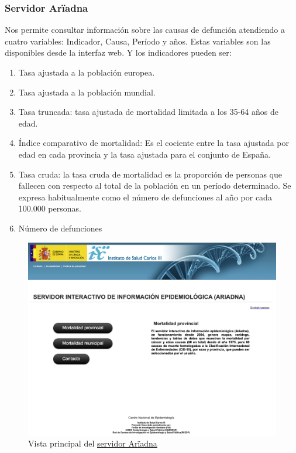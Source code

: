 \subsubsection{Servidor Arïadna}
Nos permite consultar información sobre las causas de defunción atendiendo a cuatro variables: Indicador, Causa, Período y años. Estas variables son las disponibles desde la interfaz web.
Y los indicadores pueden ser:
\begin{enumerate}
  \item Tasa ajustada a la población europea.
  \item Tasa ajustada a la población mundial.
  \item Tasa truncada: tasa ajustada de mortalidad limitada a los 35-64 años de edad.
  \item Índice comparativo de mortalidad: Es el cociente entre la tasa ajustada por edad en cada provincia y la tasa
  ajustada para el conjunto de España.
  \item Tasa cruda: la tasa cruda de mortalidad es la proporción de personas que fallecen con respecto al total
  de la población en un período determinado. Se expresa habitualmente como el número de defunciones al año
  por cada 100.000 personas.
  \item Número de defunciones
\end{enumerate}
\FloatBarrier
\begin{figure}[]
	\centering
	\includegraphics[scale=0.3]{doc/logos/imgs/ariadna1.png}
	\caption{ Vista principal del \href{http://ariadna.cne.isciii.es/}{servidor Arïadna} }
    \label{fig:worst_f_value}
\end{figure}


